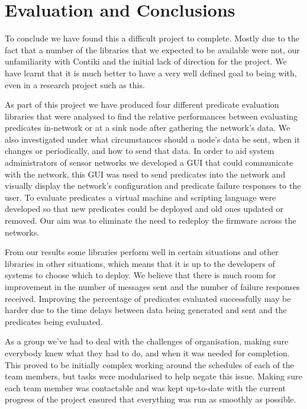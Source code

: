 \section{Evaluation and Conclusions}

To conclude we have found this a difficult project to complete. Mostly due to the fact that a number of the libraries that we expected to be available were not, our unfamiliarity with Contiki and the initial lack of direction for the project. We have learnt that it is much better to have a very well defined goal to being with, even in a research project such as this.

As part of this project we have produced four different predicate evaluation libraries that were analysed to find the relative performances between evaluating predicates in-network or at a sink node after gathering the network's data. We also investigated under what circumstances should a node's data be sent, when it changes or periodically, and how to send that data. In order to aid system administrators of sensor networks we developed a GUI that could communicate with the network, this GUI was used to send predicates into the network and visually display the network's configuration and predicate failure responses to the user. To evaluate predicates a virtual machine and scripting language were developed so that new predicates could be deployed and old ones updated or removed. Our aim was to eliminate the need to redeploy the firmware across the networks.

From our results some libraries perform well in certain situations and other libraries in other situations, which means that it is up to the developers of systems to choose which to deploy. We believe that there is much room for improvement in the number of messages sent and the number of failure responses received. Improving the percentage of predicates evaluated successfully may be harder due to the time delays between data being generated and sent and the predicates being evaluated.

As a group we've had to deal with the challenges of organisation, making sure everybody knew what they had to do, and when it was needed for completion. This proved to be initially complex working around the schedules of each of the team members, but tasks were modularised to help negate this issue. Making sure each team member was contactable and was kept up-to-date with the current progress of the project ensured that everything was run as smoothly as possible. 

